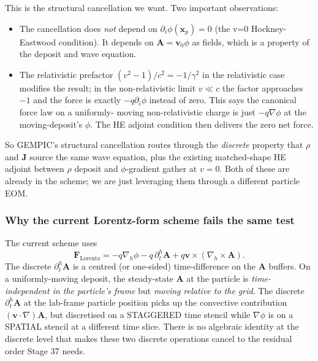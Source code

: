 \documentclass[11pt,a4paper]{article}
\newcommand{\vv}[1]{\mathbf{#1}}
\begin{document}
This is the structural cancellation we want.  Two important
observations:

\begin{itemize}
  \item The cancellation does \emph{not} depend on
    $\partial_i\phi(\vv{x}_p) = 0$ (the v=0 Hockney-Eastwood
    condition).  It depends on
    $\vv{A} = \vv{v}_0 \phi$ as fields, which is a property of
    the deposit and wave equation.
  \item The relativistic prefactor $(v^2 - 1)/c^2 = -1/\gamma^2$
    in the relativistic case modifies the result; in the
    non-relativistic limit $v \ll c$ the factor approaches $-1$
    and the force is exactly $-q \partial_i \phi$ instead of
    zero.  This says the canonical force law on a uniformly-
    moving non-relativistic charge is just $-q\nabla\phi$ at the
    moving-deposit's $\phi$.  The HE adjoint condition then
    delivers the zero net force.
\end{itemize}

So GEMPIC's structural cancellation routes through the
\emph{discrete} property that $\rho$ and $\vv{J}$ source the same
wave equation, plus the existing matched-shape HE adjoint between
$\rho$ deposit and $\phi$-gradient gather at $v=0$.  Both of these
are already in the scheme; we are just leveraging them through a
different particle EOM.

\subsubsection*{Why the current Lorentz-form scheme fails the same test}

The current scheme uses
\begin{equation}
\vv{F}_{\mathrm{Lorentz}}
 = -q\nabla_h\phi - q\,\partial^h_t\vv{A} + q\vv{v}\times(\nabla_h\times\vv{A}).
\end{equation}
The discrete $\partial^h_t\vv{A}$ is a centred (or one-sided)
time-difference on the $\vv{A}$ buffers.  On a uniformly-moving
deposit, the steady-state $\vv{A}$ at the particle is
\emph{time-independent in the particle's frame} but
\emph{moving relative to the grid}.  The discrete
$\partial^h_t\vv{A}$ at the lab-frame particle position picks up
the convective contribution $(\vv{v}\cdot\nabla)\vv{A}$, but
discretised on a STAGGERED time stencil while
$\nabla\phi$ is on a SPATIAL stencil at a different time slice.
There is no algebraic identity at the discrete level that makes
these two discrete operations cancel to the residual order Stage
37 needs.
\end{document}
